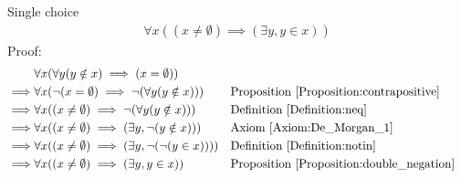 \begin{prop}
Single choice
\begin{align*}
\forall x((x \neq \emptyset) \implies (\exists y, y \in x))
\end{align*}
Proof:
\begin{align*}
& \forall x (\forall y (y \notin x) \implies (x=\emptyset)) \\
\implies & \forall x ( \lnot(x=\emptyset) \implies \lnot (\forall y (y \notin x)) )
&& \text{Proposition \ref{Proposition:contrapositive}} \\
\implies & \forall x ( (x \neq \emptyset) \implies \lnot (\forall y (y \notin x)) )
&& \text{Definition \ref{Definition:neq}} \\
\implies & \forall x ( (x \neq \emptyset) \implies (\exists y, \lnot(y \notin x)) )
&& \text{Axiom \ref{Axiom:De_Morgan_1}} \\
\implies & \forall x ( (x \neq \emptyset) \implies (\exists y, \lnot( \lnot (y \in x))) )
&& \text{Definition \ref{Definition:notin}} \\
\implies & \forall x ( (x \neq \emptyset) \implies (\exists y, y \in x ))
&& \text{Proposition \ref{Proposition:double_negation}} \\
\end{align*}
\end{prop}
